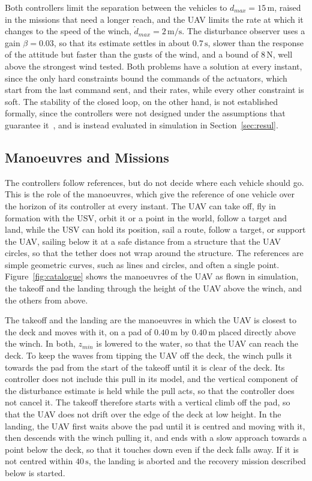 Both controllers limit the separation between the vehicles to $d_{max} = 15\,\text{m}$, raised in the missions that need a longer reach, and the UAV limits the rate at which it changes to the speed of the winch, $\dot d_{max} = 2\,\text{m/s}$. The disturbance observer uses a gain $\beta = 0.03$, so that its estimate settles in about $0.7\,\text{s}$, slower than the response of the attitude but faster than the gusts of the wind, and a bound of $8\,\text{N}$, well above the strongest wind tested. Both problems have a solution at every instant, since the only hard constraints bound the commands of the actuators, which start from the last command sent, and their rates, while every other constraint is soft. The stability of the closed loop, on the other hand, is not established formally, since the controllers were not designed under the assumptions that guarantee it~\cite{mayneConstrainedModelPredictive2000}, and is instead evaluated in simulation in Section~\ref{sec:resul}.

\subsection{Manoeuvres and Missions}

The controllers follow references, but do not decide where each vehicle should go. This is the role of the manoeuvres, which give the reference of one vehicle over the horizon of its controller at every instant. The UAV can take off, fly in formation with the USV, orbit it or a point in the world, follow a target and land, while the USV can hold its position, sail a route, follow a target, or support the UAV, sailing below it at a safe distance from a structure that the UAV circles, so that the tether does not wrap around the structure. The references are simple geometric curves, such as lines and circles, and often a single point. Figure~\ref{fig:catalogue} shows the manoeuvres of the UAV as flown in simulation, the takeoff and the landing through the height of the UAV above the winch, and the others from above.

The takeoff and the landing are the manoeuvres in which the UAV is closest to the deck and moves with it, on a pad of $0.40\,\text{m}$ by $0.40\,\text{m}$ placed directly above the winch. In both, $z_{min}$ is lowered to the water, so that the UAV can reach the deck. To keep the waves from tipping the UAV off the deck, the winch pulls it towards the pad from the start of the takeoff until it is clear of the deck. Its controller does not include this pull in its model, and the vertical component of the disturbance estimate is held while the pull acts, so that the controller does not cancel it. The takeoff therefore starts with a vertical climb off the pad, so that the UAV does not drift over the edge of the deck at low height. In the landing, the UAV first waits above the pad until it is centred and moving with it, then descends with the winch pulling it, and ends with a slow approach towards a point below the deck, so that it touches down even if the deck falls away. If it is not centred within $40\,\text{s}$, the landing is aborted and the recovery mission described below is started.


